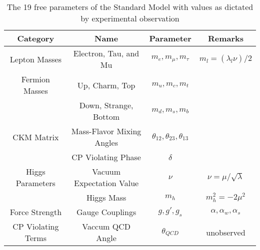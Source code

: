 \begin{center}
\begin{table}[]
\begin{center}
\caption{The 19 free parameters of the Standard Model with values as dictated by experimental observation}
\begin{tabular}{cccc}
\textbf{Category} & \textbf{Name} & \textbf{Parameter} & \textbf{Remarks} \\
\hline
Lepton Masses & Electron, Tau, and Mu  & $m_e,m_\mu,m_\tau$ & $m_l = (\lambda_l \nu)/2$ \\
Fermion Masses & Up, Charm, Top & $m_u, m_c, m_t$ & \\ 
   & Down, Strange, Bottom & $m_d, m_s, m_b$ & \\
\hline
CKM Matrix & Mass-Flavor Mixing Angles & $\theta_{12},\theta_{23},\theta_{13}$ & \\ 
 & CP Violating Phase  & $\delta$ & \\ 
\hline
Higgs Parameters & Vacuum Expectation Value &  $\nu$ & $\nu= \mu / \sqrt{\lambda}$   \\
& Higgs Mass & $m_{h}$ &   $m_h^2 = -2\mu^2$  \\
\hline
Force Strength & Gauge Couplings & $g, g', g_s$ & $\alpha, \alpha_w, \alpha_s$  \\ 
\hline
CP Violating Terms & Vaccum QCD Angle  & $\theta_{QCD}$ &  unobserved \\
\hline
\end{tabular}
\end{center}
\label{tab:free_param}
\end{table}
\end{center}
